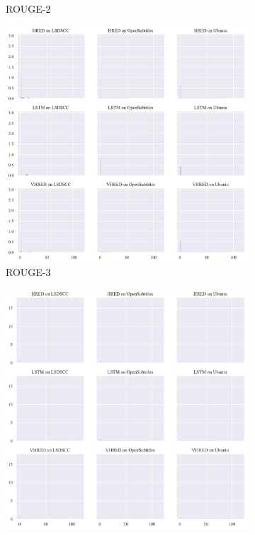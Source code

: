 \begin{figure}[H]
\begin{subfigure}{0.5\linewidth}
        \caption{ROUGE-2}
    \end{subfigure}
    \begin{subfigure}{0.5\linewidth}
        \centering
        \includegraphics[width=\linewidth]{figure/distplot_grid/rouge_3/plot.pdf}
        \caption{ROUGE-3}
    \end{subfigure}%
    \begin{subfigure}{0.5\linewidth}
        \centering
        \includegraphics[width=\linewidth]{figure/distplot_grid/rouge_4/plot.pdf}

\end{subfigure}
\end{figure}

